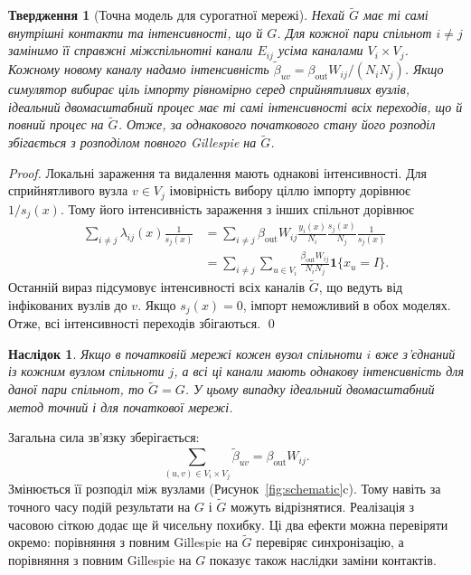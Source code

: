 \documentclass[a4paper,fleqn]{cas-sc}
\newtheorem{proposition}{Твердження}
\newtheorem{corollary}{Наслідок}
\newcommand{\ind}{\mathbf{1}}
\begin{document}
\begin{proposition}[Точна модель для сурогатної мережі]
\label{prop:surrogate}
Нехай $\tilde G$ має ті самі внутрішні контакти та інтенсивності, що й $G$. Для кожної пари спільнот $i\neq j$ замінимо її справжні міжспільнотні канали $E_{ij}$ усіма каналами $V_i\times V_j$. Кожному новому каналу надамо інтенсивність $\tilde\beta_{uv}=\beta_{\mathrm{out}}W_{ij}/(N_iN_j)$. Якщо симулятор вибирає ціль імпорту рівномірно серед сприйнятливих вузлів, ідеальний двомасштабний процес має ті самі інтенсивності всіх переходів, що й повний процес на $\tilde G$. Отже, за однакового початкового стану його розподіл збігається з розподілом повного Gillespie на $\tilde G$.
\end{proposition}

\begin{proof}
Локальні зараження та видалення мають однакові інтенсивності. Для сприйнятливого вузла $v\in V_j$ імовірність вибору ціллю імпорту дорівнює $1/s_j(x)$. Тому його інтенсивність зараження з інших спільнот дорівнює
\[
\begin{aligned}
\sum_{i\neq j}\lambda_{ij}(x)\frac{1}{s_j(x)}
&=\sum_{i\neq j}\beta_{\mathrm{out}}W_{ij}\frac{y_i(x)}{N_i}\frac{s_j(x)}{N_j}\frac{1}{s_j(x)}\\
&=\sum_{i\neq j}\sum_{u\in V_i}\frac{\beta_{\mathrm{out}}W_{ij}}{N_iN_j}\ind\{x_u=I\}.
\end{aligned}
\]
Останній вираз підсумовує інтенсивності всіх каналів $\tilde G$, що ведуть від інфікованих вузлів до $v$. Якщо $s_j(x)=0$, імпорт неможливий в обох моделях. Отже, всі інтенсивності переходів збігаються. \qed
\end{proof}

\begin{corollary}
\label{cor:exact}
Якщо в початковій мережі кожен вузол спільноти $i$ вже з'єднаний із кожним вузлом спільноти $j$, а всі ці канали мають однакову інтенсивність для даної пари спільнот, то $\tilde G=G$. У цьому випадку ідеальний двомасштабний метод точний і для початкової мережі.
\end{corollary}

Загальна сила зв'язку зберігається:
\[
\sum_{(u,v)\in V_i\times V_j}\tilde\beta_{uv}=\beta_{\mathrm{out}}W_{ij}.
\]
Змінюється її розподіл між вузлами (Рисунок~\ref{fig:schematic}c). Тому навіть за точного часу подій результати на $G$ і $\tilde G$ можуть відрізнятися. Реалізація з часовою сіткою додає ще й чисельну похибку. Ці два ефекти можна перевіряти окремо: порівняння з повним Gillespie на $\tilde G$ перевіряє синхронізацію, а порівняння з повним Gillespie на $G$ показує також наслідки заміни контактів.
\end{document}
